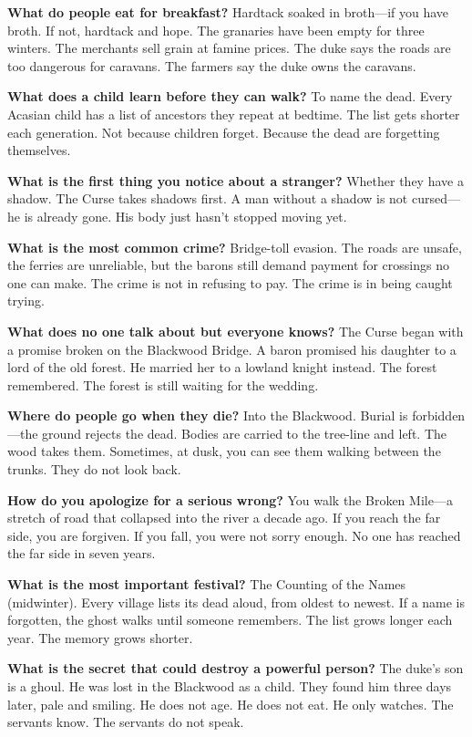 \begin{almanac}
\textbf{What do people eat for breakfast?} Hardtack soaked in broth---if you have broth. If not, hardtack and hope. The granaries have been empty for three winters. The merchants sell grain at famine prices. The duke says the roads are too dangerous for caravans. The farmers say the duke owns the caravans.

\textbf{What does a child learn before they can walk?} To name the dead. Every Acasian child has a list of ancestors they repeat at bedtime. The list gets shorter each generation. Not because children forget. Because the dead are forgetting themselves.

\textbf{What is the first thing you notice about a stranger?} Whether they have a shadow. The Curse takes shadows first. A man without a shadow is not cursed---he is already gone. His body just hasn't stopped moving yet.

\textbf{What is the most common crime?} Bridge-toll evasion. The roads are unsafe, the ferries are unreliable, but the barons still demand payment for crossings no one can make. The crime is not in refusing to pay. The crime is in being caught trying.

\textbf{What does no one talk about but everyone knows?} The Curse began with a promise broken on the Blackwood Bridge. A baron promised his daughter to a lord of the old forest. He married her to a lowland knight instead. The forest remembered. The forest is still waiting for the wedding.

\textbf{Where do people go when they die?} Into the Blackwood. Burial is forbidden---the ground rejects the dead. Bodies are carried to the tree-line and left. The wood takes them. Sometimes, at dusk, you can see them walking between the trunks. They do not look back.

\textbf{How do you apologize for a serious wrong?} You walk the Broken Mile---a stretch of road that collapsed into the river a decade ago. If you reach the far side, you are forgiven. If you fall, you were not sorry enough. No one has reached the far side in seven years.

\textbf{What is the most important festival?} The Counting of the Names (midwinter). Every village lists its dead aloud, from oldest to newest. If a name is forgotten, the ghost walks until someone remembers. The list grows longer each year. The memory grows shorter.

\textbf{What is the secret that could destroy a powerful person?} The duke's son is a ghoul. He was lost in the Blackwood as a child. They found him three days later, pale and smiling. He does not age. He does not eat. He only watches. The servants know. The servants do not speak.
\end{almanac}

